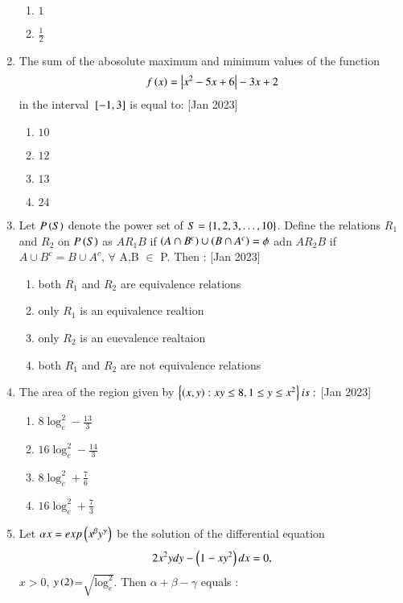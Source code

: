 \documentclass[journal]{IEEEtran}
\begin{document}
\begin{enumerate}
\begin{enumerate}
			\item $1$
			\item $\frac{1}{2}$
        	\end{enumerate}		
	\item The sum of the abosolute maximum and minimum values of the function 
             \begin{align*}
		f\left(x\right) =\left\vert x^2-5x+6\right\vert-3x+2
             \end{align*}
		in the interval ${}\left[-1,3\right]$ is equal to:
			\hfill{[Jan 2023]}
		\begin{enumerate}
			\item $10$
			\item $12$
			\item $13$
			\item $24$
        	\end{enumerate}	
	\item Let $P\left(S\right)$ denote the power set of $S =\left\{1,2,3,\ldots,10\right\}$. Define the relations $R_1$ and $R_2$ on $P\left(S\right)$ as $AR_1B$ if $\left(A \cap B^c\right)\cup \left(B\cap A^c\right)=\phi$ adn $AR_2B$ if $A\cup B^c=B\cup A^c$, $\forall$ A,B $\in$ P. Then :
		\hfill{[Jan 2023]}
		\begin{enumerate}
			\item both $R_1$ and $R_2$ are equivalence relations
			\item only $R_1$ is an equivalence realtion
			\item only $R_2$ is an euevalence realtaion
			\item both $R_1$ and $R_2$ are not equivalence relations
        	\end{enumerate}	
	\item The area of the region given by $\left\{\left(x,y\right):xy \leq 8, 1 \leq y \leq x^2 \right\} is :$
		\hfill{[Jan 2023]}
		\begin{enumerate}
			\item $8 \log^{2}_e-\frac{13}{3}$
			\item $16 \log^{2}_e-\frac{14}{3}$
			\item $8 \log^{2}_e+\frac{7}{6}$
			\item $16 \log^{2}_e+\frac{7}{3}$
        	\end{enumerate}	
	\item Let $\alpha x=exp\left(x^\beta y^\gamma\right)$ be the solution of the differential equation 
             \begin{align*}
		2x^2ydy-\left(1-xy^2\right)dx=0,
             \end{align*}
	 $x>0$, $y\left(2\right)$=$\sqrt{\log_e^2}$. Then $\alpha + \beta - \gamma$ equals :

\end{enumerate}
\end{document}

